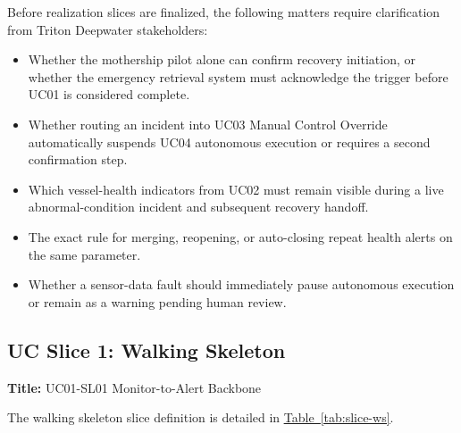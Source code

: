 \documentclass[10pt,a4paper]{article}
\let\orighyperref\hyperref
\renewcommand{\hyperref}[2][]{\orighyperref[#1]{\uline{#2}}}
\begin{document}
Before realization slices are finalized, the following matters require clarification from Triton Deepwater stakeholders:

\begin{itemize}[leftmargin=*,nosep]
  \item Whether the mothership pilot alone can confirm recovery initiation, or whether the emergency retrieval system must acknowledge the trigger before UC01 is considered complete.
  \item Whether routing an incident into UC03 Manual Control Override automatically suspends UC04 autonomous execution or requires a second confirmation step.
  \item Which vessel-health indicators from UC02 must remain visible during a live abnormal-condition incident and subsequent recovery handoff.
  \item The exact rule for merging, reopening, or auto-closing repeat health alerts on the same parameter.
  \item Whether a sensor-data fault should immediately pause autonomous execution or remain as a warning pending human review.
\end{itemize}

\subsection*{UC Slice 1: Walking Skeleton}
{}
\label{sec:uc-slice-ws}

\textbf{Title:} UC01-SL01 Monitor-to-Alert Backbone

The walking skeleton slice definition is detailed in \hyperref[tab:slice-ws]{Table~\ref*{tab:slice-ws}}.
\end{document}
